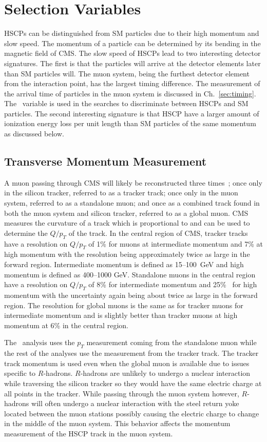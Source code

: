 \section{Selection Variables \label{sec:SelVar}}
HSCPs can be distinguished from SM particles due to their high momentum and slow speed.
The momentum of a particle can be determined by its bending in the magnetic field of CMS.
The slow speed of HSCPs lead to two interesting detector signatures. The first is that the particles will arrive at the detector elements later than SM particles will.
The muon system, being the furthest detector element from the interaction point, has the largest timing difference. The measurement of the arrival time of particles in the
muon system is discussed in Ch.~\ref{sec:timing}. The \invbeta\ variable is used in the searches to discriminate between HSCPs and SM particles.
The second interesting signature is that HSCP have a larger amount of ionization energy loss per unit length 
than SM particles of the same momentum as discussed below.

\subsection{Transverse Momentum Measurement \label{sec:PMeasurement}}
A muon passing through CMS will likely be reconstructed three times~\cite{2012JInst...7P0002T}; once only in the silicon tracker, referred to as a tracker track;
once only in the muon system, referred to as a standalone muon; and once as a combined track found in both the muon system and silicon tracker, referred
to as a global muon. CMS measures the curvature of a track which is proportional to and can be used to determine the $Q/p_T$ of the track.
In the central region of CMS, tracker tracks have a resolution on $Q/p_T$ of 1\% for muons at intermediate momentum and 7\% at
high momentum with the resolution being approximately
twice as large in the forward region. Intermediate momentum is defined as 15--100~GeV and high momentum is defined as 400--1000 GeV.
Standalone muons in the central region have a resolution on $Q/p_T$ of 8\% for intermediate momentum and 25\%~\cite{2008AN097} for high momentum with the uncertainty again
being about twice as large in the forward region. The resolution for global muons is the same as for tracker muons for intermediate momentum and is slightly better
than tracker muons at high momentum at 6\% in the central region.

The \muononly\ analysis uses the $p_T$ measurement coming from the standalone muon while the rest of the analyses use the measurement from the tracker track.
The tracker track momentum is used even when the global muon is available due to issues specific to $R$-hadrons.
$R$-hadrons are unlikely to undergo a nuclear interaction while traversing the silicon tracker so they would have the same electric charge at all points in the tracker.
While passing through the muon system however, $R$-hadrons will often undergo a nuclear interaction with the steel return yoke located between the muon stations
possibly causing the electric charge to change in the middle of the muon system. This behavior affects the momentum measurement of the HSCP track in the muon system.

